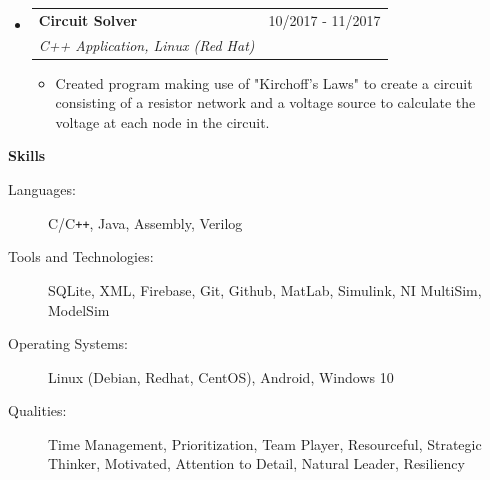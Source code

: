 \documentclass[letterpaper,11pt]{article}
\makeatletter
\newcommand{\resitem}[1]{\item #1 \vspace{-2pt}}
\newcommand{\resheading}[1]{{\large \colorbox{mygrey}{\begin{minipage}{\textwidth}{\textbf{#1 \vphantom{p\^{E}}}}\end{minipage}}}}
\newcommand{\ressubheading}[4]{
\begin{tabular*}{7.0in}{l@{\extracolsep{\fill}}r}
		\textbf{#1} & #2 \\
		\textit{#3} & \textit{#4} \\
\end{tabular*}\vspace{-6pt}}
\makeatother
\begin{document}
\begin{itemize}
  	\item
      \ressubheading{Circuit Solver}{10/2017 -   11/2017}{C++ Application, Linux (Red Hat)}{}
      \begin{itemize}
          \resitem{Created program making use of "Kirchoff's Laws" to create a circuit consisting of a resistor network and a voltage source to calculate the voltage at each node in the circuit.}
      \end{itemize}
    

\end{itemize}


\resheading{Skills}

\begin{description}
\item[Languages:]
C/C{}\verb!++!, Java, Assembly, Verilog
\item[Tools and Technologies:]
SQLite, XML, Firebase, Git, Github, MatLab, Simulink, NI MultiSim, ModelSim
\item[Operating Systems:]
Linux (Debian, Redhat, CentOS), Android, Windows 10
\item[Qualities:]
Time Management, Prioritization, Team Player, Resourceful, Strategic Thinker, Motivated, Attention to Detail, Natural Leader, Resiliency
\end{description}


\pagebreak
\end{document}
